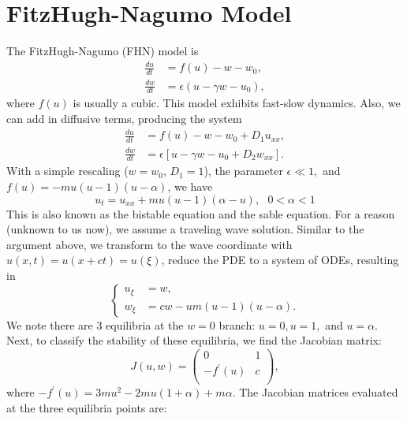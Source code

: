 \documentclass[]{article}
\numberwithin{equation}{section}		%
\def\dt#1{\frac{d#1}{dt}{}}
\begin{document}
\section{FitzHugh-Nagumo Model}
The FitzHugh-Nagumo (FHN) model is 
\begin{align*}
 \dt{u} &= f(u)-w-w_0, \\
\dt{w} &= \epsilon(u-\gamma w-u_0),
\end{align*} where $f(u)$ is usually a cubic. This model exhibits fast-slow dynamics. Also, we can add in diffusive terms, producing the system 
\begin{align*}
 \dt{u} &= f(u)-w-w_0 + D_1 u_{xx}, \\
\dt{w} &= \epsilon\left[u-\gamma w-u_0 + D_2 w_{xx}\right].
\end{align*} With a simple rescaling ($w=w_0$, $D_1=1$), the parameter $\epsilon \ll 1,$ and $f(u)=-mu(u-1)(u-\alpha)$, we have
\begin{equation}
u_t=u_{xx}+mu(u - 1)(\alpha - u), \ \ \ 0<\alpha<1
\end{equation} This is also known as the bistable equation and the sable equation. For a reason (unknown to us now), we assume a traveling wave solution. Similar to the argument above, we transform to the wave coordinate with $u(x,t) = u(x+ct) = u(\xi)$, reduce the PDE to a system of ODEs, resulting in 
\begin{equation*}
\begin{cases}
u_{\xi} & = w,\\
w_{\xi} & = cw - um(u-1)(u-\alpha).
\end{cases}
\end{equation*} We note there are 3 equilibria at the $w=0$ branch: $u=0, u=1,$ and $u=\alpha$. Next, to classify the stability of these equilibria, we find the Jacobian matrix:
\begin{equation*}
J(u,w)=
\begin{pmatrix}
  0 & 1 \\
  -f^{'}(u) & c \\
\end{pmatrix},
\end{equation*} where $-f^{'}(u)=3mu^2 - 2mu(1+\alpha) + m\alpha$. The Jacobian matrices evaluated at the three equilibria points are:
\end{document}
